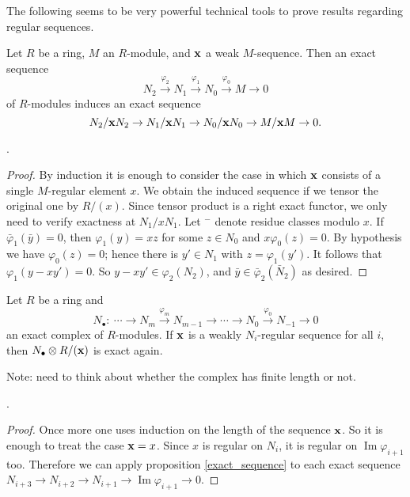 	The following seems to be very powerful technical tools to prove results regarding regular sequences.
	
	\begin{proposition}\label{exact_sequence}
		Let $R$ be a ring, $M$ an $R$-module, and $\mathbf{x}$ a weak $M$-sequence. Then an exact sequence
		$$
		N_2 \xrightarrow{\varphi_2} N_1 \xrightarrow{\varphi_1}N_0 \xrightarrow{\varphi_0}M \to 0
		$$
		of $R$-modules induces an exact sequence
		$$
		N_2/\mathbf{x} N_2 \to N_1 /\mathbf{x} N_1 \to N_0 /\mathbf{x} N_0 \to M / \mathbf{x} M \to 0.
		$$
		
		\cite[Proposition 1.1.4]{BH}.
	\end{proposition}
	
	\begin{proof}
		By induction it is enough to consider the case in which $\mathbf{x}$ consists of a single $M$-regular element $x$. We obtain the induced sequence if we tensor the original one by $R/(x)$. Since tensor product is a right exact functor, we only need to verify exactness at $N_1/xN_1$. Let $^-$ denote residue classes modulo $x$. If $\bar{\varphi}_1(\bar{y}) = 0$, then $\varphi_1(y) = xz$ for some $z \in N_0$ and $x\varphi_0(z) = 0$. By hypothesis we have $\varphi_0(z) = 0$; hence there is $y' \in N_1$ with $z = \varphi_1(y')$. It follows that $\varphi_1(y - xy') = 0$. So $y - xy' \in \varphi_2(N_2)$, and $\bar{y} \in \bar{\varphi}_2(\bar{N}_2)$ as desired.
	\end{proof}
	
	\begin{proposition}
		Let $R$ be a ring and
		$$
		N_\bullet: \ \cdots \to N_m \xrightarrow{\varphi_m} N_{m-1} \to \cdots \to N_0 \xrightarrow{\varphi_0}N_{-1} \to 0
		$$
		an exact complex of $R$-modules. If $\mathbf{x}$ is a weakly $N_i$-regular sequence for all $i$, then $N_\bullet \otimes R/(\mathbf{x})$ is exact again.
		
		Note: need to think about whether the complex has finite length or not.
		
		\cite[Proposition 1.1.5]{BH}.
	\end{proposition}
	
	\begin{proof}
		Once more one uses induction on the length of the sequence $\mathbf{x}$. So it is enough to treat the case $\mathbf{x} = x$. Since $x$ is regular on $N_i$, it is regular on $\operatorname{Im} \varphi_{i+1}$ too. Therefore we can apply proposition \ref{exact_sequence} to each exact sequence $N_{i+3} \to N_{i+2} \to N_{i+1} \to \operatorname{Im} \varphi_{i+1} \to 0$.
	\end{proof}
	
